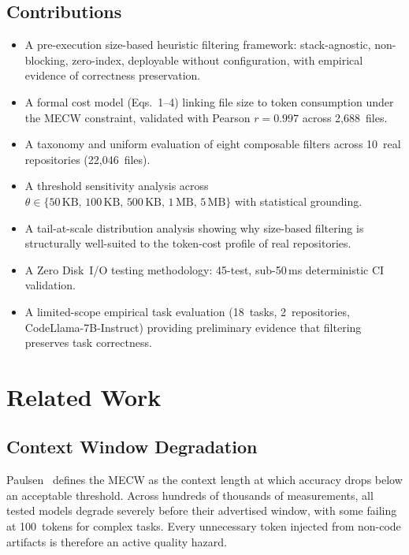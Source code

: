 \documentclass[conference]{IEEEtran}
\begin{document}
\subsection{Contributions}
\begin{itemize}
  \item[\textbf{C1.}] A pre-execution size-based heuristic filtering
    framework: stack-agnostic, non-blocking, zero-index, deployable
    without configuration, with empirical evidence of correctness
    preservation.
  \item[\textbf{C2.}] A formal cost model (Eqs.~1--4) linking file size
    to token consumption under the MECW constraint, validated with
    Pearson $r{=}0.997$ across 2,688~files.
  \item[\textbf{C3.}] A taxonomy and uniform evaluation of eight
    composable filters across 10~real repositories (22,046~files).
  \item[\textbf{C4.}] A threshold sensitivity analysis across
    $\theta \in \{50\,\text{KB},\,100\,\text{KB},\,500\,\text{KB},\,
    1\,\text{MB},\,5\,\text{MB}\}$ with statistical grounding.
  \item[\textbf{C5.}] A tail-at-scale distribution analysis showing why
    size-based filtering is structurally well-suited to the token-cost
    profile of real repositories.
  \item[\textbf{C6.}] A Zero Disk~I/O testing methodology: 45-test,
    sub-50\,ms deterministic CI validation.
  \item[\textbf{C7.}] A limited-scope empirical task evaluation
    (18~tasks, 2~repositories, CodeLlama-7B-Instruct) providing
    preliminary evidence that filtering preserves task correctness.
\end{itemize}

\section{Related Work}

\subsection{Context Window Degradation}
Paulsen~\cite{paulsen2025} defines the MECW as the context length at
which accuracy drops below an acceptable threshold. Across hundreds of
thousands of measurements, all tested models degrade severely before
their advertised window, with some failing at 100~tokens for complex
tasks. Every unnecessary token injected from non-code artifacts is
therefore an active quality hazard.
\end{document}
